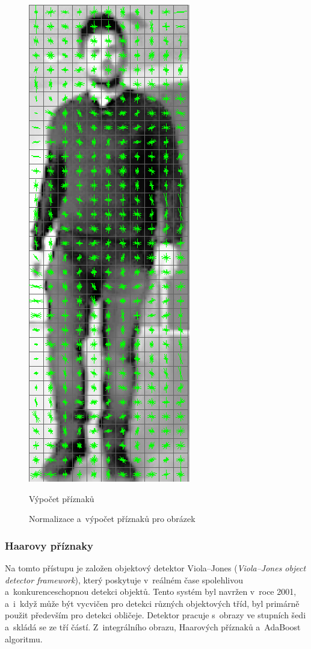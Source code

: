 \begin{figure}[H]
\begin{minipage}{.3\textwidth}
  \includegraphics[width=.5\linewidth]{figures/features}
  \caption*{Výpočet příznaků}
  \label{fig:hog_features}
\end{minipage}
\caption{Normalizace a~výpočet příznaků pro obrázek}
\label{fig:hogCalc}
\end{figure}

\subsubsection*{Haarovy příznaky}
Na tomto přístupu je založen objektový detektor Viola--Jones (\textit{Viola--Jones object detector framework}), který poskytuje v~reálném čase spolehlivou a~konkurenceschopnou detekci objektů. Tento systém byl navržen v~roce 2001, a~i~když může být vycvičen pro detekci různých objektových tříd, byl primárně použit především pro detekci obličeje. Detektor pracuje s~obrazy ve stupních šedi a~skládá se ze tří částí. Z~integrálního obrazu, Haarových příznaků a~AdaBoost algoritmu. 

